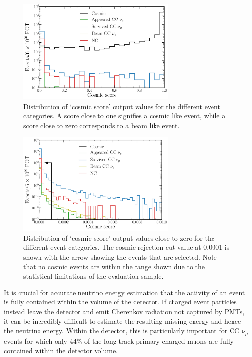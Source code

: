 \begin{figure} %
    \includegraphics[width=0.7\textwidth]{diagrams/6-cvn/chipsnet/final_cosmic_outputs.pdf}
    \caption[Distribution of cosmic score output values.]
    {Distribution of `cosmic score' output values for the different event categories. A score
        close to one signifies a cosmic like event, while a score close to zero corresponds to a
        beam like event.}
    \label{fig:cosmic_outputs}
\end{figure}

\begin{figure} %
    \includegraphics[width=0.7\textwidth]{diagrams/6-cvn/chipsnet/final_cosmic_zoomed_outputs.pdf}
    \caption[Distribution of cosmic score output values close to zero.]
    {Distribution of `cosmic score' output values close to zero for the different event
        categories. The cosmic rejection cut value at 0.0001 is shown with the arrow showing the
        events that are selected. Note that no cosmic events are within the range shown due to the
        statistical limitations of the evaluation sample.}
    \label{fig:cosmic_zoomed_outputs}
\end{figure}

It is crucial for accurate neutrino energy estimation that the activity of an event is fully
contained within the volume of the detector. If charged event particles instead leave the detector
and emit Cherenkov radiation not captured by PMTs, it can be incredibly difficult to estimate the
resulting missing energy and hence the neutrino energy. Within the \chipsfive detector, this is
particularly important for CC $\nu_{\mu}$ events for which only 44\% of the long track primary
charged muons are fully contained within the detector volume.


